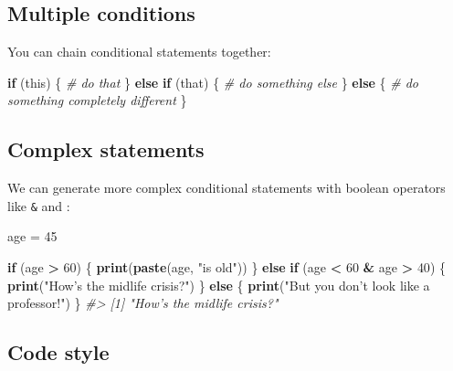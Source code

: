 \documentclass[]{book}
\newenvironment{Shaded}{\begin{snugshade}}{\end{snugshade}}
\newcommand{\KeywordTok}[1]{\textcolor[rgb]{0.13,0.29,0.53}{\textbf{#1}}}
\newcommand{\DecValTok}[1]{\textcolor[rgb]{0.00,0.00,0.81}{#1}}
\newcommand{\StringTok}[1]{\textcolor[rgb]{0.31,0.60,0.02}{#1}}
\newcommand{\CommentTok}[1]{\textcolor[rgb]{0.56,0.35,0.01}{\textit{#1}}}
\newcommand{\ControlFlowTok}[1]{\textcolor[rgb]{0.13,0.29,0.53}{\textbf{#1}}}
\newcommand{\OperatorTok}[1]{\textcolor[rgb]{0.81,0.36,0.00}{\textbf{#1}}}
\newcommand{\NormalTok}[1]{#1}
\begin{document}
\subsection{Multiple conditions}\label{multiple-conditions}

You can chain conditional statements together:

\begin{Shaded}
\begin{Highlighting}[]
\ControlFlowTok{if}\NormalTok{ (this) \{}
  \CommentTok{# do that}
\NormalTok{\} }\ControlFlowTok{else} \ControlFlowTok{if}\NormalTok{ (that) \{}
  \CommentTok{# do something else}
\NormalTok{\} }\ControlFlowTok{else}\NormalTok{ \{}
  \CommentTok{# do something completely different}
\NormalTok{\}}
\end{Highlighting}
\end{Shaded}

\subsection{Complex statements}\label{complex-statements}

We can generate more complex conditional statements with boolean
operators like \texttt{\&} and \texttt{\textbar{}\textbar{}}:

\begin{Shaded}
\begin{Highlighting}[]
\NormalTok{age =}\StringTok{ }\DecValTok{45} 

\ControlFlowTok{if}\NormalTok{ (age }\OperatorTok{>}\StringTok{ }\DecValTok{60}\NormalTok{) \{}
    \KeywordTok{print}\NormalTok{(}\KeywordTok{paste}\NormalTok{(age, }\StringTok{"is old"}\NormalTok{))}
\NormalTok{\} }\ControlFlowTok{else} \ControlFlowTok{if}\NormalTok{ (age }\OperatorTok{<}\StringTok{ }\DecValTok{60} \OperatorTok{&}\StringTok{ }\NormalTok{age }\OperatorTok{>}\StringTok{ }\DecValTok{40}\NormalTok{) \{}
    \KeywordTok{print}\NormalTok{(}\StringTok{"How's the midlife crisis?"}\NormalTok{)}
\NormalTok{\} }\ControlFlowTok{else}\NormalTok{ \{}
    \KeywordTok{print}\NormalTok{(}\StringTok{"But you don't look like a professor!"}\NormalTok{)}
\NormalTok{\}}
\CommentTok{#> [1] "How's the midlife crisis?"}
\end{Highlighting}
\end{Shaded}

\subsection{Code style}\label{code-style}
\end{document}
